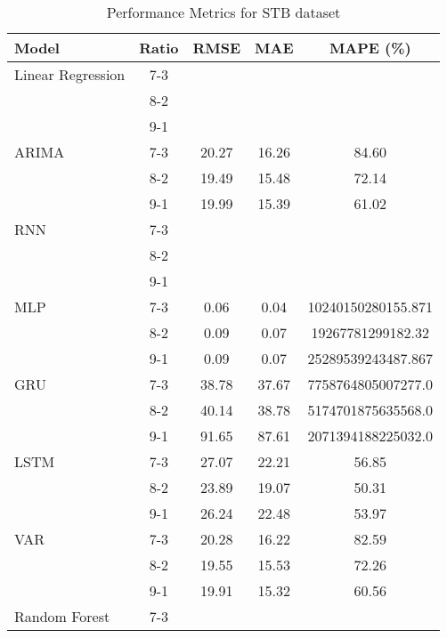 \begin{table}[h!]
    \centering
    \caption{Performance Metrics for STB dataset}
    \begin{tabular}{|l|c|c|c|c|}
    \hline
    \rowcolor{orange!30} \textbf{Model} & \textbf{Ratio} & \textbf{RMSE} & \textbf{MAE} & \textbf{MAPE (\%)} \\ \hline
    \rowcolor{white} Linear Regression & 7-3 &  &  &  \\ \hline
    \rowcolor{white}  & 8-2 &  &  &  \\ \hline
    \rowcolor{white}  & 9-1 &  &  &  \\ \hline
    \rowcolor{white} ARIMA & 7-3 & 20.27 & 16.26 & 84.60 \\ \hline
    \rowcolor{white}  & 8-2 & 19.49 & 15.48 & 72.14 \\ \hline
    \rowcolor{white}  & 9-1 & 19.99 & 15.39 & 61.02 \\ \hline
    \rowcolor{white} RNN & 7-3 &  &  &  \\ \hline
    \rowcolor{white}  & 8-2 &  &  &  \\ \hline
    \rowcolor{white}  & 9-1 &  &  &  \\ \hline
    \rowcolor{white} MLP & 7-3 & 0.06 & 0.04& 10240150280155.871 \\ \hline
    \rowcolor{white}  & 8-2 & 0.09 & 0.07 & 19267781299182.32 \\ \hline
    \rowcolor{white}  & 9-1 & 0.09 & 0.07& 25289539243487.867  \\ \hline
    \rowcolor{white} GRU & 7-3 & 38.78 & 37.67 & 7758764805007277.0 \\ \hline
    \rowcolor{white}  & 8-2 & 40.14 & 38.78 & 5174701875635568.0 \\ \hline
    \rowcolor{white}  & 9-1 & 91.65 & 87.61 & 2071394188225032.0 \\ \hline
    \rowcolor{white} LSTM & 7-3 & 27.07 & 22.21 & 56.85 \\ \hline
    \rowcolor{white}  & 8-2 & 23.89 & 19.07 & 50.31 \\ \hline
    \rowcolor{white}  & 9-1 & 26.24 & 22.48 & 53.97 \\ \hline
    \rowcolor{white} VAR & 7-3 & 20.28 & 16.22 & 82.59 \\ \hline
    \rowcolor{white}  & 8-2 & 19.55 & 15.53 & 72.26 \\ \hline
    \rowcolor{white}  & 9-1 & 19.91 & 15.32 & 60.56 \\ \hline
    \rowcolor{white} Random Forest & 7-3 &  &  &  \\ \hline

\end{tabular}
\end{table}
